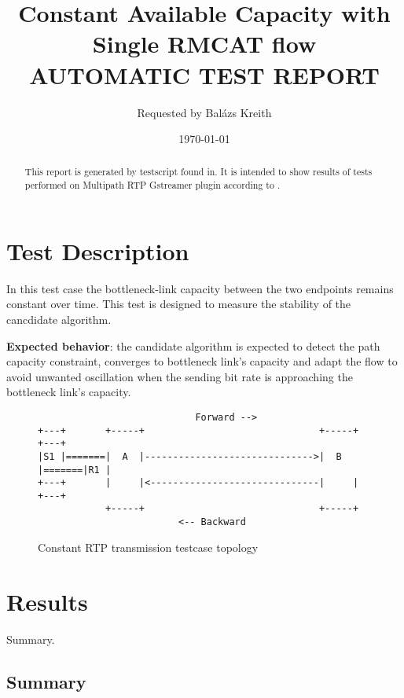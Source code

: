 \documentclass[a4paper]{article}
\title{
Constant Available Capacity with Single RMCAT flow
\\[1cm]
\large \textbf{AUTOMATIC TEST REPORT}
\\[1cm]
}
\author{
Requested by 
Balázs Kreith
}
\date{\today}
\begin{document}
\maketitle


\begin{abstract}
This report is generated by testscript found in\cite{mprtp_gstreamer_github}. It is intended to show results of tests performed on Multipath RTP Gstreamer plugin according to \cite{rmcat_test_draft}.
\end{abstract}

\section{Test Description}


\label{sec:introduction}
 
In this test case the bottleneck-link capacity between the two
endpoints remains constant over time. This test is designed to measure 
the stability of the cancdidate algorithm.

\textbf{Expected behavior}: the candidate algorithm is expected to detect the
path capacity constraint, converges to bottleneck link's capacity and
adapt the flow to avoid unwanted oscillation when the sending bit
rate is approaching the bottleneck link's capacity.  

\begin{figure}
\begin{verbatim}
                            Forward -->
+---+       +-----+                               +-----+       +---+
|S1 |=======|  A  |------------------------------>|  B  |=======|R1 |
+---+       |     |<------------------------------|     |       +---+
            +-----+                               +-----+
                         <-- Backward
\end{verbatim}
\caption{Constant RTP transmission testcase topology}
\label{fig:ascii-box}
\end{figure}



\section{Results}
\label{sec:results}

Summary.

\subsection{Summary}
\end{document}

